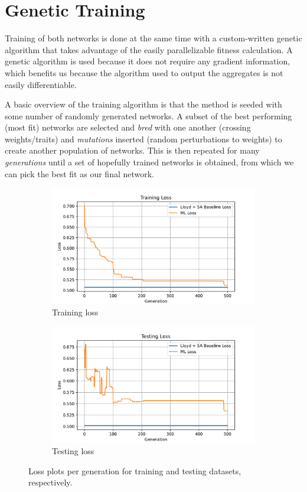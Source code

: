 \documentclass{article}
\begin{document}
\section{Genetic Training}
Training of both networks is done at the same time with a custom-written genetic algorithm that takes advantage of the easily parallelizable fitness calculation.  A genetic algorithm is used because it does not require any gradient information, which benefits us because the algorithm used to output the aggregates is not easily differentiable.

A basic overview of the training algorithm is that the method is seeded with some number of randomly generated networks. A subset of the best performing (most fit) networks are selected and \textit{bred} with one another (crossing weights/traits) and \textit{mutations} inserted (random perturbations to weights) to create another population of networks.  This is then repeated for many \textit{generations} until a set of hopefully trained networks is obtained, from which we can pick the best fit as our final network.

\begin{figure}[h]
  \centering
  \begin{subfigure}[t]{0.49\textwidth}
    \centering
    \includegraphics[width=\textwidth]{train_loss.pdf}
    \caption{Training loss}
  \end{subfigure}
  \hfill
  \begin{subfigure}[t]{0.49\textwidth}
    \centering
    \includegraphics[width=\textwidth]{test_loss.pdf}
    \caption{Testing loss}
  \end{subfigure}
  \caption{Loss plots per generation for training and testing datasets, respectively.}
  \label{fig:loss}
\end{figure}
\end{document}
